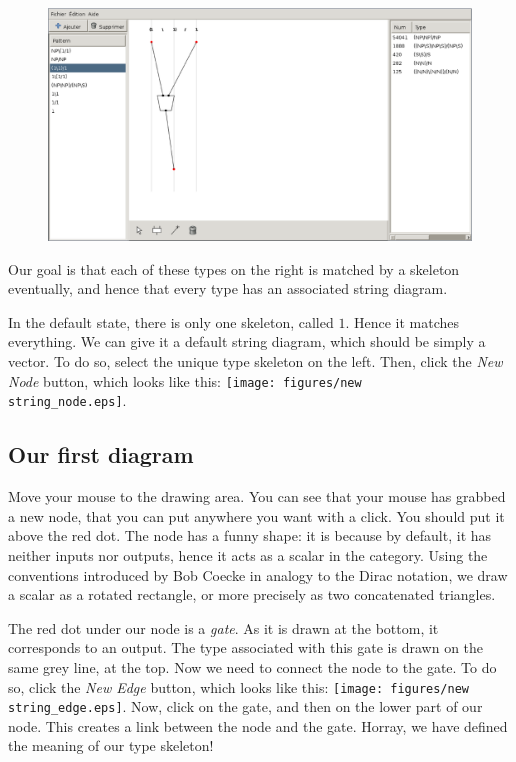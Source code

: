 \documentclass[a4paper]{article}
\begin{document}
\begin{figure}[H]
\centering
\includegraphics[scale=0.35]{figures/yanker.eps}
\end{figure}

Our goal is that each of these types on the right is matched by a
skeleton eventually, and hence that every type has an associated string diagram.

In the default state, there is only one skeleton, called $1$. Hence it matches
everything. We can give it a default string diagram, which should be simply a vector.
To do so, select the unique type skeleton on the left. Then, click the \emph{New Node}
button, which looks like this:
\texttt{[image: figures/new\\string\_node.eps]}.

\subsection{Our first diagram}
Move your mouse to the drawing area. You can see that your mouse has grabbed a new node,
that you can put anywhere you want with a click. You should put it above the red dot.
The node has a funny shape: it is because by default, it has neither inputs nor
outputs, hence it acts as a scalar in the category. Using the conventions
introduced by Bob Coecke in analogy to the Dirac notation,
we draw a scalar as a rotated rectangle, or more precisely as two concatenated triangles.

The red dot under our node is a \emph{gate}. As it is drawn at the bottom, it corresponds
to an output. The type associated with this gate is drawn on the same grey line, at the top.
Now we need to connect the node to the gate. To do so, click the \emph{New Edge} button,
which looks like this:
\texttt{[image: figures/new\\string\_edge.eps]}.
Now, click on the gate, and then on the lower part of
our node. This creates a link between the node and the gate. Horray, we have defined
the meaning of our type skeleton!
\end{document}
